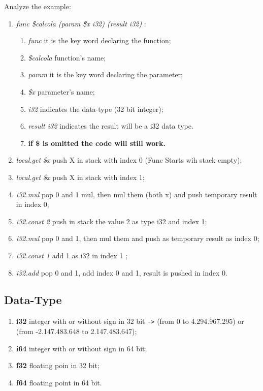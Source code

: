 Analyze the example: 
\begin{enumerate}
    \item \textit{func \$calcola (param \$x i32) (result i32) }:
        \begin{enumerate}
            \item \textit{func} it is the key word declaring the function;
            \item \textit{\$calcola} function's name;
            \item \textit{param} it is the key word declaring the parameter;
            \item \textit{\$x} parameter's name;
            \item \textit{i32} indicates the data-type (32 bit integer);
            \item \textit{result i32} indicates the result will be a i32 data type.
            \item \textbf{if \$ is omitted the code will still work.}
        \end{enumerate}
    
    \item \textit{local.get \$x} push X in stack with index 0 (Func Starts wih stack empty);
    \item \textit{local.get \$x} push X in stack with index 1;
    \item \textit{i32.mul} pop 0 and 1 mul, then mul them (both x) and push temporary result in index 0; 
    \item \textit{i32.const 2} push in stack the value 2 as type i32 and index 1;
    \item \textit{i32.mul} pop 0 and 1, then mul them and push as temporary result as index 0;
    \item \textit{i32.const 1} add 1 as i32 in index 1 ;
    \item \textit{i32.add} pop 0 and 1, add index 0 and 1, result is pushed in index 0.
\end{enumerate}

\subsection{Data-Type}

\begin{enumerate}
    \item \textbf{i32} integer with or without sign in 32 bit \texttt{->} (from 0 to 4.294.967.295) or (from -2.147.483.648 to 2.147.483.647);
    \item \textbf{i64} integer with or without sign in 64 bit;
    \item \textbf{f32} floating poin in 32 bit;
    \item \textbf{f64} floating point in 64 bit.
\end{enumerate}


